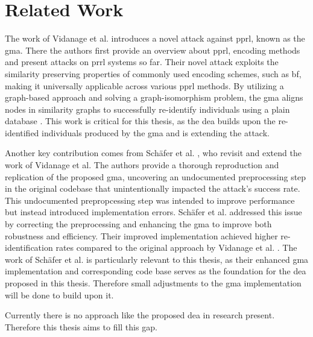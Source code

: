 \section{Related Work}  \label{sec:rel-work}

The work of Vidanage et al. \cite{vidanage2020graph} introduces a novel attack against \ac{pprl}, known as the \ac{gma}.
There the authors first provide an overview about \ac{pprl}, encoding methods and present attacks on \ac{prrl} systems so far.
Their novel attack exploits the similarity preserving properties of commonly used encoding schemes, such as \ac{bf}, making it universally applicable across various \ac{pprl} methods.
By utilizing a graph-based approach and solving a graph-isomorphism problem, the \ac{gma} aligns nodes in similarity graphs to successfully re-identify individuals using a plain database \cite{vidanage2020graph}.
This work is critical for this thesis, as the \ac{dea} builds upon the re-identified individuals produced by the \ac{gma} and is extending the attack.

Another key contribution comes from Schäfer et al. \cite{schaefer2024}, who revisit and extend the work of Vidanage et al. \cite{vidanage2020graph}
The authors provide a thorough reproduction and replication of the proposed \ac{gma}, uncovering an undocumented preprocessing step in the original codebase that unintentionally impacted the attack's success rate.
This undocumented prepropcessing step was intended to improve performance but instead introduced implementation errors.
Schäfer et al. addressed this issue by correcting the preprocessing and enhancing the \ac{gma} to improve both robustness and efficiency.
Their improved implementation achieved higher re-identification rates compared to the original approach by Vidanage et al. \cite{schaefer2024}.
The work of Schäfer et al. is particularly relevant to this thesis, as their enhanced \ac{gma} implementation and corresponding code base serves as the foundation for the \ac{dea} proposed in this thesis.
Therefore small adjustments to the \ac{gma} implementation will be done to build upon it.

Currently there is no approach like the proposed \ac{dea} in research present. Therefore this thesis aims to fill this gap.


